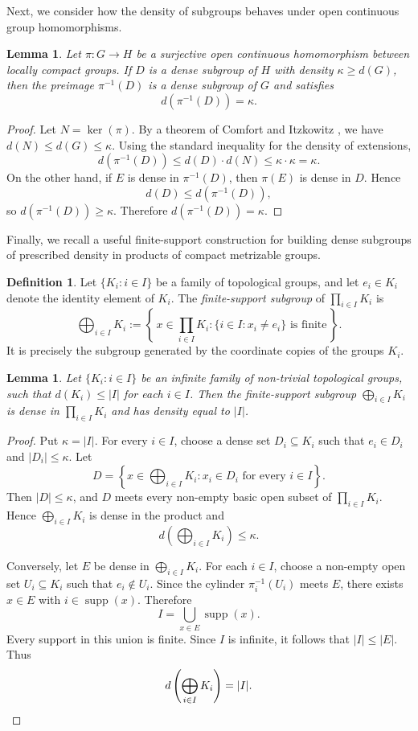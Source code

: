\documentclass[12pt]{amsart}
\newtheorem{lemma}[theorem]{Lemma}
\theoremstyle{definition}
\newtheorem{definition}[theorem]{Definition}
\numberwithin{equation}{section}
\theoremstyle{remark}
\begin{document}
Next, we consider how the density of subgroups behaves under open continuous group homomorphisms.

\begin{lemma}\label{preimage}
Let $\pi: G \to H$ be a surjective open continuous homomorphism between locally compact groups.  
If $D$ is a dense subgroup of $H$ with density $\kappa \geq d(G)$, then the preimage $\pi^{-1}(D)$ is a dense subgroup of $G$ and satisfies
\[
d(\pi^{-1}(D)) = \kappa.
\]
\end{lemma}

\begin{proof}
Let $N = \ker(\pi)$. By a theorem of Comfort and Itzkowitz \cite[2.4 Theorem]{CIt}, we have $d(N) \leq d(G) \leq \kappa$.  
Using the standard inequality for the density of extensions,
\[
d(\pi^{-1}(D)) \leq d(D) \cdot d(N) \leq \kappa \cdot \kappa = \kappa.
\]
On the other hand, if $E$ is dense in $\pi^{-1}(D)$, then $\pi(E)$ is dense in $D$. Hence
\[
d(D)\leq d(\pi^{-1}(D)),
\]
so $d(\pi^{-1}(D))\geq\kappa$. Therefore $d(\pi^{-1}(D))=\kappa$.
\end{proof}

Finally, we recall a useful finite-support construction for building dense subgroups of prescribed density in products of compact metrizable groups.

\begin{definition}
Let $\{K_i : i \in I\}$ be a family of topological groups, and let $e_i \in K_i$ denote the identity element of $K_i$. The \emph{finite-support subgroup} of $\prod_{i\in I}K_i$ is
\[
\bigoplus_{i\in I}K_i := \left\{\, x \in \prod_{i \in I} K_i : \{i \in I : x_i \neq e_i\} \text{ is finite} \,\right\}.
\]
It is precisely the subgroup generated by the coordinate copies of the groups $K_i$.
\end{definition}

\begin{lemma}\label{prod}
Let $\{K_i : i \in I\}$ be an infinite family of non-trivial topological groups, such that $d(K_i)\leq |I|$ for each $i\in I$.
Then the finite-support subgroup $\bigoplus_{i\in I}K_i$ is dense in $\prod_{i \in I} K_i$ and has density equal to $|I|$.
\end{lemma}

\begin{proof}
Put $\kappa=|I|$. For every $i\in I$, choose a dense set $D_i\subseteq K_i$ such that $e_i\in D_i$ and $|D_i|\leq\kappa$. Let
\[
D=\left\{x\in\bigoplus_{i\in I}K_i:x_i\in D_i\text{ for every }i\in I\right\}.
\]
Then $|D|\leq\kappa$, and $D$ meets every non-empty basic open subset of $\prod_{i\in I}K_i$. Hence $\bigoplus_{i\in I}K_i$ is dense in the product and
\[
d\left(\bigoplus_{i\in I}K_i\right)\leq\kappa.
\]

Conversely, let $E$ be dense in $\bigoplus_{i\in I}K_i$. For each $i\in I$, choose a non-empty open set $U_i\subseteq K_i$ such that $e_i\notin U_i$. Since the cylinder $\pi_i^{-1}(U_i)$ meets $E$, there exists $x\in E$ with $i\in\operatorname{supp}(x)$. Therefore
\[
I=\bigcup_{x\in E}\operatorname{supp}(x).
\]
Every support in this union is finite. Since $I$ is infinite, it follows that $|I|\leq|E|$. Thus
\[
d\left(\bigoplus_{i\in I}K_i\right)=|I|.\qedhere
\]
\end{proof}
\end{document}
